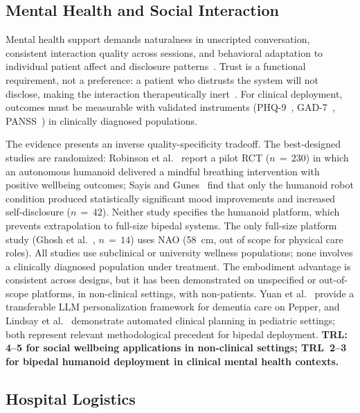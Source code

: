 \subsection{Mental Health and Social Interaction}
\label{sec:mentalhealth}

Mental health support demands naturalness in unscripted conversation, consistent
interaction quality across sessions, and behavioral adaptation to individual
patient affect and disclosure patterns~\cite{fitzpatrick2017woebot}. Trust is a functional requirement, not a
preference: a patient who distrusts the system will not disclose, making the
interaction therapeutically inert~\cite{lucas2014computer}. For clinical deployment, outcomes must be
measurable with validated instruments
(PHQ-9~\cite{kroenke2001phq9}, GAD-7~\cite{spitzer2006gad7},
PANSS~\cite{kay1987panss}) in clinically diagnosed populations.

The evidence presents an inverse quality-specificity tradeoff. The
best-designed studies are randomized: Robinson et al.~\cite{robinson2023brief}
report a pilot RCT ($n\,=\,230$) in which an autonomous humanoid delivered a
mindful breathing intervention with positive wellbeing outcomes; Sayis and
Gunes~\cite{sayis2024technology} find that only the humanoid robot condition
produced statistically significant mood improvements and increased self-disclosure
($n\,=\,42$). Neither study specifies the humanoid platform, which prevents
extrapolation to full-size bipedal systems. The only full-size platform study
(Ghosh et al.~\cite{ghosh2024usercentered}, $n\,=\,14$) uses NAO (58~cm, out of
scope for physical care roles). All studies use subclinical or university wellness
populations; none involves a clinically diagnosed population under treatment. The
embodiment advantage is consistent across designs, but it has been demonstrated
on unspecified or out-of-scope platforms, in non-clinical settings, with
non-patients. Yuan et al.~\cite{yuan2025integrating} provide a transferable LLM
personalization framework for dementia care on Pepper, and Lindsay et
al.~\cite{lindsay2022socially} demonstrate automated clinical planning in
pediatric settings; both represent relevant methodological precedent for bipedal
deployment. \textbf{TRL: 4--5 for social wellbeing applications in non-clinical
settings; TRL~2--3 for bipedal humanoid deployment in clinical mental health
contexts.}

\subsection{Hospital Logistics}
\label{sec:logistics}

